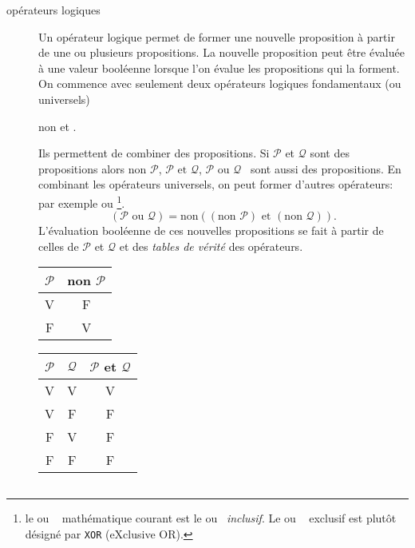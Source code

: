 \begin{description}
\item[opérateurs logiques] Un opérateur logique permet de former une nouvelle proposition à partir de une ou plusieurs propositions. La nouvelle proposition peut être évaluée à une valeur booléenne lorsque l'on évalue les propositions qui la forment.\newline
On commence avec seulement deux opérateurs logiques fondamentaux (ou universels)
\begin{center}
  \og non \fg \hspace{1cm} \og et \fg.
\end{center}
Ils permettent de combiner des propositions. Si $\mathcal{P}$ et $\mathcal{Q}$ sont des propositions alors \og$\text{non } \mathcal{P}$\fg, \og$\mathcal{P} \text{ et } \mathcal{Q}$\fg, \og$\mathcal{P} \text{ ou } \mathcal{Q}$\fg~ sont aussi des propositions.\newline
En combinant les opérateurs universels, on peut former d'autres opérateurs: par exemple \og ou \fg\footnote{le \og ou \fg~ mathématique courant est le \og ou\fg~ \emph{inclusif}. Le \og ou \fg~ exclusif est plutôt désigné par \texttt{XOR} (eXclusive OR).}.
\[
 \left( \mathcal{P} \text{ ou } \mathcal{Q}\right)  = \text{non}\left( (\text{non } \mathcal{P}) \text{ et } (\text{non }\mathcal{Q})\right) .
\]
L'évaluation booléenne de ces nouvelles propositions se fait à partir de celles de $\mathcal{P}$ et $\mathcal{Q}$ et des \emph{tables de vérité}  des opérateurs.
\begin{center}
\hfill
 \begin{tabular}{|c|c|}
\hline
$\mathcal{P}$ & non $\mathcal{P}$ \\ \hline
V             & F                 \\ \hline
F             & V                 \\ \hline
 \end{tabular} 
\hfill
 \begin{tabular}{|c|c|c|}
\hline
$\mathcal{P}$ & $\mathcal{Q}$ & $\mathcal{P}$ et $\mathcal{Q}$ \\ \hline
V             & V             &   V  \\ \hline
V             & F             &   F \\ \hline
F             & V             &   F \\ \hline
F             & F             &   F  \\ \hline
 \end{tabular} 
\hfill  
 \begin{tabular}{|c|c|c|}

\end{tabular}
\end{center}
\end{description}
